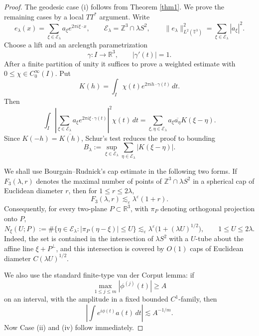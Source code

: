 \documentclass[11pt,reqno]{amsart}
\numberwithin{equation}{section}
\newcommand{\1}{\textbf{1}}
\newcommand{\la}{\lambda}
\begin{document}
	\begin{proof}
		The geodesic case (i) follows from Theorem \ref{thm1}.  We prove the
		remaining cases by a local \(TT^*\) argument.  Write
		\[
		e_\lambda(x)=\sum_{\xi\in \mathcal E_\lambda}a_\xi e^{2\pi i\xi\cdot x},
		\qquad
		\mathcal E_\lambda=\mathbb Z^3\cap \lambda S^2,
		\qquad
		\|e_\lambda\|_{L^2(\mathbb T^3)}^2=\sum_{\xi\in\mathcal E_\lambda}|a_\xi|^2 .
		\]
		Choose a lift and an arclength parametrization
		\[
		\gamma:I\to\mathbb R^3,\qquad |\gamma'(t)|=1 .
		\]
		After a finite partition of unity it suffices to prove a weighted estimate
		with \(0\leq \chi\in C_0^\infty(I)\).  Put
		\[
		K(h)=\int_I \chi(t)e^{2\pi i h\cdot \gamma(t)}\,dt .
		\]
		Then
		\[
		\int_I \left|\sum_{\xi\in\mathcal E_\lambda}
		a_\xi e^{2\pi i\xi\cdot\gamma(t)}\right|^2\chi(t)\,dt
		=
		\sum_{\xi,\eta\in\mathcal E_\lambda}
		a_\xi\overline{a_\eta}K(\xi-\eta).
		\]
		Since \(K(-h)=\overline{K(h)}\), Schur's test reduces the proof to bounding
		\[
		B_\lambda:=\sup_{\xi\in\mathcal E_\lambda}
		\sum_{\eta\in\mathcal E_\lambda}|K(\xi-\eta)|.
		\]
		
		We shall use Bourgain--Rudnick's cap estimate \cite{BR2011} in the following two forms. If $F_3(\la,r)$ denotes the maximal number of points of $\mathbb{Z}^3\cap \la S^2$ in a spherical cap of Euclidean diameter $r$, then for \(1\le r\le 2\lambda\),
		\[
		F_3(\la,r)
		\lesssim_\varepsilon \lambda^\varepsilon(1+r).
		\]
		Consequently, for every two-plane \(P\subset\mathbb R^3\), with
		\(\pi_P\) denoting orthogonal projection onto \(P\),
		\[
		N_\xi(U;P)
		:=
		\#\{\eta\in\mathcal E_\lambda:|\pi_P(\eta-\xi)|\le U\}
		\lesssim_\varepsilon
		\lambda^\varepsilon\bigl(1+(\lambda U)^{1/2}\bigr),
		\qquad 1\le U\le 2\lambda .
		\]
		Indeed, the set is contained in the intersection of \(\lambda S^2\) with a
		\(U\)-tube about the affine line \(\xi+P^\perp\), and this intersection is
		covered by \(O(1)\) caps of Euclidean diameter \(C(\lambda U)^{1/2}\).
		
		We also use the standard finite-type van der Corput lemma: if
		\[
		\max_{1\le j\le m} |\phi^{(j)}(t)|\ge A
		\]
		on an interval, with the amplitude in a fixed bounded \(C^1\)-family, then
		\[
		\left|\int e^{i\phi(t)}a(t)\,dt\right|\lesssim A^{-1/m}.
		\]
		Now Case (ii) and (iv) follow immediately.
		

\end{proof}
\end{document}

